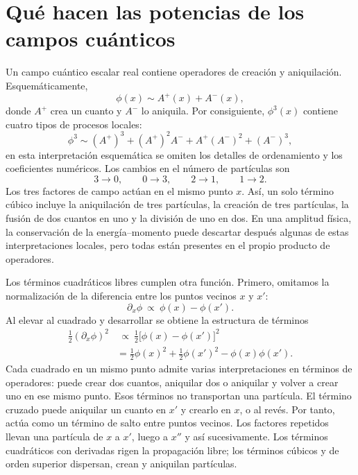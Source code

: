 \section{Qué hacen las potencias de los campos cuánticos}

Un campo cuántico escalar real contiene operadores de creación y aniquilación. Esquemáticamente,
\begin{equation}
\phi(x)\sim A^+(x)+A^-(x),
\end{equation}
donde \(A^+\) crea un cuanto y \(A^-\) lo aniquila. Por consiguiente, \(\phi^3(x)\) contiene cuatro tipos de procesos locales:
\begin{equation}
\phi^3
\sim
(A^+)^3+(A^+)^2A^-+A^+(A^-)^2+(A^-)^3,
\end{equation}
en esta interpretación esquemática se omiten los detalles de ordenamiento y los coeficientes numéricos. Los cambios en el número de partículas son
\begin{equation}
3\longrightarrow0,
\qquad
0\longrightarrow3,
\qquad
2\longrightarrow1,
\qquad
1\longrightarrow2.
\end{equation}
Los tres factores de campo actúan en el mismo punto \(x\). Así, un solo término cúbico incluye la aniquilación de tres partículas, la creación de tres partículas, la fusión de dos cuantos en uno y la división de uno en dos. En una amplitud física, la conservación de la energía--momento puede descartar después algunas de estas interpretaciones locales, pero todas están presentes en el propio producto de operadores.

Los términos cuadráticos libres cumplen otra función. Primero, omitamos la normalización de la diferencia entre los puntos vecinos \(x\) y \(x'\):
\begin{equation}
\partial_x\phi
\ \propto\
\phi(x)-\phi(x').
\end{equation}
Al elevar al cuadrado y desarrollar se obtiene la estructura de términos
\begin{align}
\frac12(\partial_x\phi)^2
&\ \propto\
\frac12\bigl[\phi(x)-\phi(x')\bigr]^2
\\
&=
\frac12\phi(x)^2
+\frac12\phi(x')^2
-\phi(x)\phi(x').
\end{align}
Cada cuadrado en un mismo punto admite varias interpretaciones en términos de operadores: puede crear dos cuantos, aniquilar dos o aniquilar y volver a crear uno en ese mismo punto. Esos términos no transportan una partícula. El término cruzado puede aniquilar un cuanto en \(x'\) y crearlo en \(x\), o al revés. Por tanto, actúa como un término de salto entre puntos vecinos. Los factores repetidos llevan una partícula de \(x\) a \(x'\), luego a \(x''\) y así sucesivamente. Los términos cuadráticos con derivadas rigen la propagación libre; los términos cúbicos y de orden superior dispersan, crean y aniquilan partículas.

